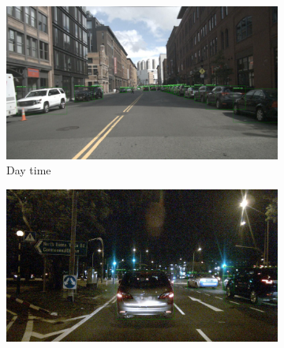\documentclass[report.tex]{subfiles}
\begin{document}
          
          

          \begin{figure}[ht]
            \centering
            \begin{subfigure}{0.3\textwidth}
                \centering
                \includegraphics[width=\linewidth]{images/datasets/nuscenes/samples/day_cam.png}
                \caption{Day time}
                \label{fig:sub1}
            \end{subfigure}
            \hfill
            \begin{subfigure}{0.3\textwidth}
                \centering
                \includegraphics[width=\linewidth]{images/datasets/nuscenes/samples/night_cam.png}

\end{subfigure}
\end{figure}
\end{document}
